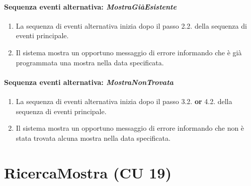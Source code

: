 \documentclass{article}
\begin{document}
	\paragraph{Sequenza eventi alternativa: \textit{MostraGiàEsistente}}
	\begin{enumerate}	[leftmargin=28pt]
			\item  La sequenza di eventi alternativa inizia dopo il passo 2.2. della sequenza di eventi principale.
			\item  Il sistema mostra un opportuno messaggio di errore informando che è già programmata una mostra nella data specificata.
		\end{enumerate}
		
	\paragraph{Sequenza eventi alternativa: \textit{MostraNonTrovata}}
	\begin{enumerate}	[leftmargin=28pt]
			\item  La sequenza di eventi alternativa inizia dopo il passo 3.2. \textbf{or} 4.2. della sequenza di eventi principale.
			\item  Il sistema mostra un opportuno messaggio di errore informando che non è stata trovata alcuna mostra nella data specificata.
		\end{enumerate}
		
	
	
	




	\pagebreak 

		\section*{RicercaMostra (CU 19)}
	
\end{document}
